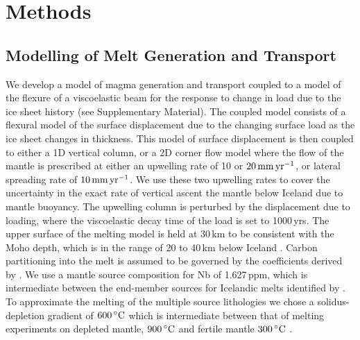 \documentclass[draft,linenumbers]{agujournal2018}
\begin{document}
\section{Methods}
\subsection{Modelling of Melt Generation and Transport}

We develop a model of magma generation and transport coupled to a model of the flexure of a viscoelastic beam for the response to change in load due to the ice sheet history (see Supplementary Material). The coupled model consists of a flexural model of the surface displacement due to the changing surface load as the ice sheet changes in thickness. This model of surface displacement is then coupled to either a 1D vertical column, or a 2D corner flow model where the flow of the mantle is prescribed at either an upwelling rate of 10 or $20\rm\,mm\,yr^{-1}$, or lateral spreading rate of $10\rm\,mm\,yr^{-1}$. We use these two upwelling rates to cover the uncertainty in the exact rate of vertical ascent the mantle below Iceland due to mantle buoyancy. The upwelling column is perturbed by the displacement due to loading, where the viscoelastic decay time of the load is set to 1000\,yrs. The upper surface of the melting model is held at 30\,km to be consistent with the Moho depth, which is in the range of 20 to 40\,km below Iceland \citep{jenkins-etal-2018}. Carbon partitioning into the melt is assumed to be governed by the coefficients derived by \cite{rosenthal-etal-2015}. We use a mantle source composition for Nb of 1.627\,ppm, which is intermediate between the end-member sources for Icelandic melts identified by \citep{shorttle-2011}. To approximate the melting of the multiple source lithologies we chose a solidus-depletion gradient of $600\rm\,^{\circ}C$ which is intermediate between that of melting experiments on depleted mantle, $900\rm\,^{\circ}C$ \citep{wasylenki-etal-2003} and fertile mantle $300\rm\,^{\circ}C$ \citep{scott-1992}.
\end{document}
